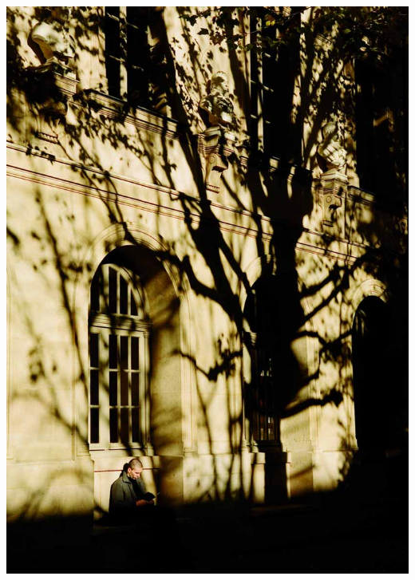 \documentclass[slidestop,11pt,compress,serif]{beamer} %
\begin{document}
\begin{frame}[plain,t]
\begin{minipage}{.18\linewidth}
    \includegraphics[width=\linewidth]{images/ens-073}

    \bigskip
    \bigskip
    \bigskip
    \bigskip


\end{minipage}
\end{frame}
\end{document}

